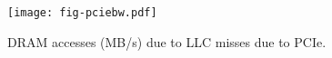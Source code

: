 \begin{figure}[t]
\texttt{[image: fig-pciebw.pdf]}
\caption{DRAM accesses (MB/s) due to LLC misses due to PCIe.}
\label{fig:pciebw}
\end{figure}

